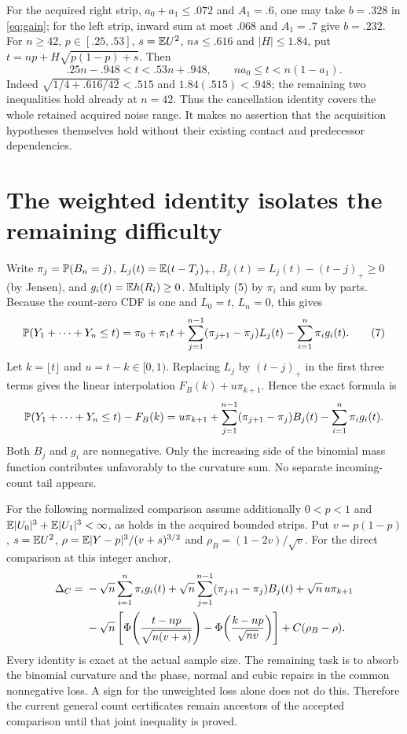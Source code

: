 \documentclass[11pt]{article}
\begin{document}
For the acquired right strip, $a_0+a_1\le.072$ and $A_1=.6$, one may
take $b=.328$ in \eqref{eq:gain}; for the left strip, inward sum at most
$.068$ and $A_1=.7$ give $b=.232$. For $n\ge42$, $p\in[.25,.53]$,
$s=\mathbb E U^2$, $ns\le.616$ and $|H|\le1.84$, put
$t=np+H\sqrt{p(1-p)+s}$. Then
\[
 .25n-.948<t<.53n+.948,\qquad
                   na_0\le t<n(1-a_1).
\]
Indeed $\sqrt{1/4+.616/42}<.515$ and $1.84(.515)<.948$;
the remaining two inequalities hold already at $n=42$. Thus the
cancellation identity covers the whole retained acquired noise range.
It makes no assertion that the acquisition hypotheses themselves hold
without their existing contact and predecessor dependencies.

\section*{The weighted identity isolates the remaining difficulty}
Write $\pi_j=\mathbb P(B_n=j)$, $L_j(t)=\mathbb E(t-T_j)_+$,
$B_j(t)=L_j(t)-(t-j)_+\ge0$ (by Jensen), and
$g_i(t)=\mathbb E h(R_i)\ge0$. Multiply (5) by $\pi_i$ and sum by parts.
Because the count-zero CDF is one and $L_0=t$, $L_n=0$, this gives
\[
 \mathbb P(Y_1+\cdots+Y_n\le t)
 =\pi_0+\pi_1t+\sum_{j=1}^{n-1}(\pi_{j+1}-\pi_j)L_j(t)
                 -\sum_{i=1}^n\pi_i g_i(t).                \tag{7}
\]
Let $k=\lfloor t\rfloor$ and $u=t-k\in[0,1)$. Replacing $L_j$ by
$(t-j)_+$ in the first three terms gives the linear interpolation
$F_B(k)+u\pi_{k+1}$. Hence the exact formula is
\begin{equation}\label{eq:weighted}
 \mathbb P(Y_1+\cdots+Y_n\le t)-F_B(k)
 =u\pi_{k+1}+\sum_{j=1}^{n-1}(\pi_{j+1}-\pi_j)B_j(t)
                 -\sum_{i=1}^n\pi_i g_i(t).
\end{equation}
Both $B_j$ and $g_i$ are nonnegative. Only the increasing side of the
binomial mass function contributes unfavorably to the curvature sum.
No separate incoming-count tail appears.

For the following normalized comparison assume additionally $0<p<1$
and $\mathbb E|U_0|^3+\mathbb E|U_1|^3<\infty$, as holds in the acquired bounded
strips. Put $v=p(1-p)$, $s=\mathbb E U^2$,
$\rho=\mathbb E|Y-p|^3/(v+s)^{3/2}$ and $\rho_B=(1-2v)/\sqrt v$.
For the direct comparison at this integer anchor,
\begin{align}\label{eq:delta}
 \Delta_C={}&-\sqrt n\sum_{i=1}^n\pi_i g_i(t)
       +\sqrt n\sum_{j=1}^{n-1}(\pi_{j+1}-\pi_j)B_j(t)
       +\sqrt n\,u\pi_{k+1}\notag\\
 &-\sqrt n\left[
 \Phi\!\left(\frac{t-np}{\sqrt{n(v+s)}}\right)
 -\Phi\!\left(\frac{k-np}{\sqrt{nv}}\right)\right]
                  +C(\rho_B-\rho).
\end{align}
Every identity is exact at the actual sample size. The remaining task is
to absorb the binomial curvature and the phase, normal and cubic repairs
in the common nonnegative loss. A sign for the unweighted loss alone does
not do this. Therefore the current general count certificates remain
ancestors of the accepted comparison until that joint inequality is proved.
\end{document}
